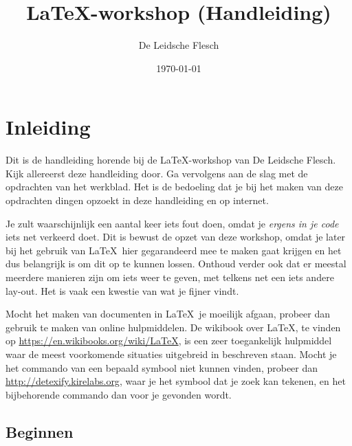 \documentclass{article}
\title{\LaTeX-workshop (Handleiding)}
\author{De Leidsche Flesch}
\date{\today}
\begin{document}
\maketitle
\tableofcontents
\newpage

\section{Inleiding}

Dit is de handleiding horende bij de \LaTeX-workshop van De Leidsche Flesch.
Kijk allereerst deze handleiding door. Ga vervolgens aan de slag met de opdrachten van het werkblad. Het is
de bedoeling dat je bij het maken van deze opdrachten dingen opzoekt in deze handleiding en op internet. 

Je zult waarschijnlijk een aantal keer iets fout doen, omdat je \emph{ergens in
je code} iets net verkeerd doet. Dit is bewust de opzet van deze workshop, omdat
je later bij het gebruik van \LaTeX\ hier gegarandeerd mee te maken gaat krijgen
en het dus belangrijk is om dit op te kunnen lossen. Onthoud verder ook dat er
meestal meerdere manieren zijn om iets weer te geven, met telkens net een iets
andere lay-out. Het is vaak een kwestie van wat je fijner vindt.

Mocht het maken van documenten in \LaTeX  \ je moeilijk afgaan, 
probeer dan gebruik te maken van online hulpmiddelen. 
De wikibook over \LaTeX, te vinden op \url{https://en.wikibooks.org/wiki/LaTeX}, 
is een zeer toegankelijk hulpmiddel waar de meest voorkomende situaties uitgebreid in beschreven staan. 
Mocht je het commando van een bepaald symbool niet kunnen vinden, probeer dan \url{http://detexify.kirelabs.org}, waar je het symbool dat je zoek kan tekenen, en het bijbehorende commando dan voor je gevonden wordt.

\subsection{Beginnen}
\end{document}
